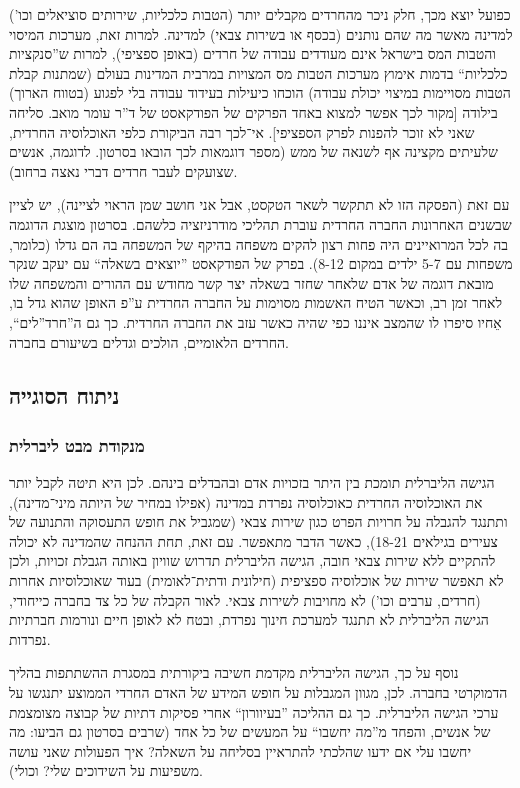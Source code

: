 \documentclass[]{../../../../tex/classes/styledArticle}
\begin{document}
	כפועל יוצא מכך, חלק ניכר מהחרדים מקבלים יותר (הטבות כלכליות, שירותים סוציאלים וכו') למדינה מאשר מה שהם נותנים (בכסף או בשירות צבאי) למדינה. למרות זאת, מערכות המיסוי והטבות המס בישראל אינם מעודדים עבודה של חרדים (באופן ספציפי), למרות ש''סנקציות כלכליות`` בדמות אימוץ מערכות הטבות מס המצויות במרבית המדינות בעולם (שמתנות קבלת הטבות מסויימות במיצוי יכולת עבודה) הוכחו כיעילות בעידוד עבודה בלי לפגוע (בטווח הארוך) בילודה [מקור לכך אפשר למצוא באחד הפרקים של הפודקאסט של ד''ר עומר מואב. סליחה שאני לא זוכר להפנות לפרק הספציפי]. אי־לכך רבה הביקורת כלפי האוכלוסיה החרדית, שלעיתים מקצינה אף לשנאה של ממש (מספר דוגמאות לכך הובאו בסרטון. לדוגמה, אנשים שצועקים לעבר חרדים דברי נאצה ברחוב). 
	
	עם זאת (הפסקה הזו לא תתקשר לשאר הטקסט, אבל אני חושב שמן הראוי לציינה), יש לציין שבשנים האחרונות החברה החרדית עוברת תהליכי מודרניזציה כלשהם. בסרטון מוצגת הדוגמה בה לכל המרואיינים היה פחות רצון להקים משפחה בהיקף של המשפחה בה הם גדלו (כלומר, משפחות עם 5-7 ילדים במקום 8-12). בפרק של הפודקאסט ''יוצאים בשאלה`` עם יעקב שנקר מובאת דוגמה של אדם שלאחר שחזר בשאלה יצר קשר מחודש עם ההורים והמשפחה שלו לאחר זמן רב, וכאשר הטיח האשמות מסוימות על החברה החרדית ע''פ האופן שהוא גדל בו, אֵחיו סיפרו לו שהמצב איננו כפי שהיה כאשר עזב את החברה החרדית. כך גם ה''חרד''לים``, החרדים הלאומיים, הולכים וגדלים בשיעורם בחברה. 
	
	\subsection*{ניתוח הסוגייה}
	\subsubsection*{מנקודת מבט ליברלית}
	הגישה הליברלית תומכת בין היתר בזכויות אדם ובהבדלים בינהם. לכן היא תיטה לקבל יותר את האוכלוסיה החרדית כאוכלוסיה נפרדת במדינה (אפילו במחיר של היותה מיני־מדינה), ותתנגד להגבלה על חרויות הפרט כגון שירות צבאי (שמגביל את חופש התעסוקה והתנועה של צעירים בגילאים 18-21), כאשר הדבר מתאפשר. עם זאת, תחת ההנחה שהמדינה לא יכולה להתקיים ללא שירות צבאי חובה, הגישה הליברלית תדרוש שוויון באותה הגבלת זכויות, ולכן לא תאפשר שירות של אוכלוסיה ספציפית (חילונית ודתית־לאומית) בעוד שאוכלוסיות אחרות (חרדים, ערבים וכו') לא מחויבות לשירות צבאי. לאור הקבלה של כל צד בחברה כייחודי, הגישה הליברלית לא תתנגד למערכת חינוך נפרדת, ובטח לא לאופן חיים ונורמות חברתיות נפרדות. 
	
	נוסף על כך, הגישה הליברלית מקדמת חשיבה ביקורתית במסגרת ההשתתפות בהליך הדמוקרטי בחברה. לכן, מגוון המגבלות על חופש המידע של האדם החרדי הממוצע יתנגשו על ערכי הגישה הליברלית. כך גם ההליכה ''בעיוורון`` אחרי פסיקות דתיות של קבוצה מצומצמת של אנשים, והפחד מ''מה יחשבו`` על המעשים של כל אחד (שרבים בסרטון גם הביעו: מה יחשבו עלי אם ידעו שהלכתי להתראיין בסליחה על השאלה? איך הפעולות שאני עושה משפיעות על השידוכים שלי? וכולי). 
	
\end{document}
